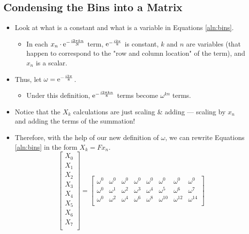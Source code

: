 \documentclass{article}
\begin{document}
\subsection*{Condensing the Bins into a Matrix}
\begin{itemize}
    \item {}Look at what is a constant and what is a variable in Equations \ref{aln:bins}.
    \begin{itemize}
        \item In each $x_n\cdot\e[-\frac{i2\pi kn}{N}]$ term, $\e[-\frac{i2\pi}{8}]$ is constant, $k$ and $n$ are variables (that happen to correspond to the "row and column location" of the term), and $x_n$ is a scalar.
    \end{itemize}
    \item Thus, let $\omega = \e[-\frac{i2\pi}{8}]$.
    \begin{itemize}
        \item Under this definition, $\e[-\frac{i2\pi kn}{8}]$ terms become $\omega^{kn}$ terms.
    \end{itemize}
    \item Notice that the $X_k$ calculations are just scaling \& adding --- scaling by $x_n$ and adding the terms of the summation!
    \item Therefore, with the help of our new definition of $\omega$, we can rewrite Equations \ref{aln:bins} in the form $X_k=Fx_n$.
    \begin{equation*}
        \begin{bmatrix}
            X_0\\
            X_1\\
            X_2\\
            X_3\\
            X_4\\
            X_5\\
            X_6\\
            X_7\\
        \end{bmatrix}
        =
        \begin{bmatrix}
            \omega^0 & \omega^0 & \omega^0    & \omega^0    & \omega^0    & \omega^0    & \omega^0    & \omega^0   \\
            \omega^0 & \omega^1 & \omega^2    & \omega^3    & \omega^4    & \omega^5    & \omega^6    & \omega^7   \\
            \omega^0 & \omega^2 & \omega^4    & \omega^6    & \omega^8    & \omega^{10} & \omega^{12} & \omega^{14}\\

\end{bmatrix}
\end{equation*}
\end{itemize}
\end{document}
